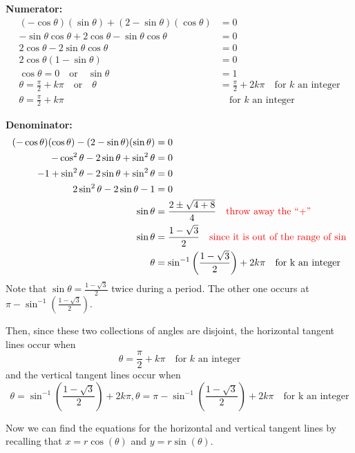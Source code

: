 \documentclass[noinstructornotest]{ximera}
\begin{document}
\begin{problem}
\begin{freeResponse}
	{\bf Numerator:}
		\begin{align*}
		(- \cos \theta)(\sin \theta) + (2 - \sin \theta)(\cos \theta) &= 0  \\
		- \sin \theta \cos \theta + 2 \cos \theta - \sin \theta \cos \theta &= 0  \\
		2 \cos \theta - 2 \sin \theta \cos \theta &= 0  \\
		2 \cos \theta (1 - \sin \theta) &= 0  \\
		\cos \theta = 0 \quad \text{or} \quad \sin \theta &= 1  \\
		\theta = \frac{\pi}{2} + k \pi  \quad  \text{or}  \quad  \theta &= \frac{\pi}{2} + 2k\pi \quad \text{for } k \text{ an integer}  \\
		\theta = \frac{\pi}{2} + k \pi  &\quad \text{for } k \text{ an integer}
		\end{align*}
		
	{\bf Denominator:}
		\begin{align*}
		(-\cos \theta)(\cos \theta) - (2 - \sin \theta)(\sin \theta) &= 0  \\
		- \cos^2 \theta - 2 \sin \theta + \sin^2 \theta &= 0  \\
		-1 + \sin^2 \theta - 2 \sin \theta + \sin^2 \theta &= 0  \\
		2 \sin^2 \theta - 2 \sin \theta - 1 &= 0  \\
		\sin \theta &= \frac{2 \pm \sqrt{4 + 8}}{4}  	\quad  {\color{red}\text{throw away the ``+'' }}\\
		\sin \theta &= \frac{1 - \sqrt{3}}{2}  \quad {\color{red}\text{since it is out of the range of sin}}\\
		\theta &= \sin^{-1} \left( \frac{1-\sqrt{3}}{2} \right) + 2 k \pi 	\quad \text{for k an integer}
		\end{align*}
	Note that $\sin \theta = \frac{1-\sqrt{3}}{2}$ twice during a period. The other one occurs at $\pi - \sin^{-1}\left(\frac{1-\sqrt{3}}{2}\right)$. 
		
	Then, since these two collections of angles are disjoint, the horizontal tangent lines occur when
		\[
		\boxed{\theta = \frac{\pi}{2} + k \pi}  \quad \text{for } k \text{ an integer}
		\]
	and the vertical tangent lines occur when
		\[
		\boxed{\theta = \sin^{-1} \left( \frac{1-\sqrt{3}}{2} \right) + 2 k \pi, \theta = \pi - \sin^{-1}\left(\frac{1-\sqrt{3}}{2}\right)+2k \pi} 	\quad \text{for k an integer}
		\]
		
		Now we can find the equations for the horizontal and vertical tangent lines by recalling that $x=r\cos(\theta)$ and $y=r\sin(\theta)$.   \\
		

\end{freeResponse}
\end{problem}
\end{document}
